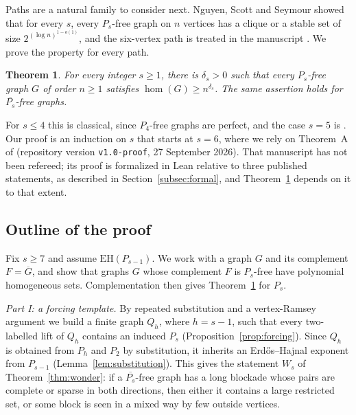 \documentclass[11pt,a4paper]{article}
\newtheorem{theorem}{Theorem}[section]
\theoremstyle{definition}
\theoremstyle{remark}
\numberwithin{equation}{section}
\newcommand{\EH}{\mathrm{EH}}
\begin{document}
Paths are a natural family to consider next. Nguyen, Scott and Seymour \cite{nss} showed that for every \(s\), every \(P_s\)-free graph on \(n\) vertices has a clique or a stable set of size \(2^{(\log n)^{1-o(1)}}\), and the six-vertex path is treated in the manuscript \cite{p6}. We prove the property for every path.
\begin{theorem}\label{thm:target}
For every integer \(s\ge1\), there is \(\delta_s>0\) such that every \(P_s\)-free graph \(G\) of order \(n\ge1\) satisfies \(\hom(G)\ge n^{\delta_s}\). The same assertion holds for \(\overline{P_s}\)-free graphs.
\end{theorem}
For \(s\le4\) this is classical, since \(P_4\)-free graphs are perfect, and the case \(s=5\) is \cite{nss7}. Our proof is an induction on \(s\) that starts at \(s=6\), where we rely on Theorem~A of \cite{p6} (repository version \texttt{v1.0-proof}, 27 September 2026). That manuscript has not been refereed; its proof is formalized in Lean relative to three published statements, as described in Section~\ref{subsec:formal}, and Theorem~\ref{thm:target} depends on it to that extent.

\subsection{Outline of the proof}\label{subsec:outline}
Fix \(s\ge7\) and assume \(\EH(P_{s-1})\). We work with a graph \(G\) and its complement \(F=\overline G\), and show that graphs \(G\) whose complement \(F\) is \(P_s\)-free have polynomial homogeneous sets. Complementation then gives Theorem~\ref{thm:target} for \(P_s\).

\emph{Part I: a forcing template.} By repeated substitution and a vertex-Ramsey argument we build a finite graph \(Q_h\), where \(h=s-1\), such that every two-labelled lift of \(Q_h\) contains an induced \(P_s\) (Proposition~\ref{prop:forcing}). Since \(Q_h\) is obtained from \(P_h\) and \(P_2\) by substitution, it inherits an Erd\H{o}s--Hajnal exponent from \(P_{s-1}\) (Lemma~\ref{lem:substitution}). This gives the statement \(W_s\) of Theorem~\ref{thm:wonder}: if a \(\overline{P_s}\)-free graph has a long blockade whose pairs are complete or sparse in both directions, then either it contains a large restricted set, or some block is seen in a mixed way by few outside vertices.
\end{document}
